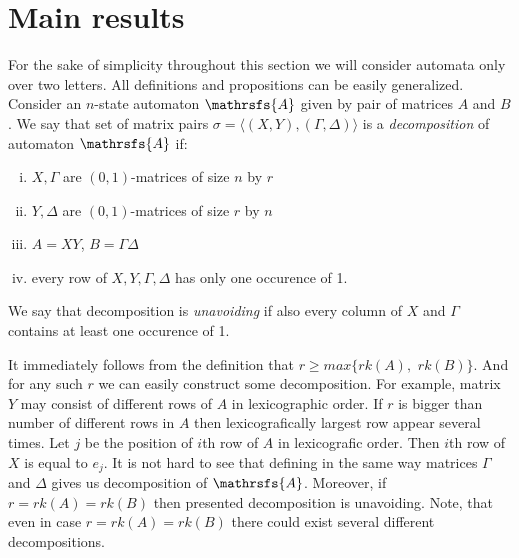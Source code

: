 \documentclass[11pt]{llncs}
\newcommand{\A}{\mathrsfs{A}}
\newcommand{\G}{\Gamma}
\newcommand{\D}{\Delta}
\newcommand{\rk}{rk}
\begin{document}
\section{Main results}
For the sake of simplicity throughout this section we will consider automata only
over two letters. All definitions and propositions can be easily generalized.
Consider an $n$-state automaton $\A$ given by pair of matrices $A$ and $B$.
We say that set of matrix pairs $\sigma = \langle(X,Y), (\G,\D)\rangle$ is
a \emph{decomposition} of automaton $\A$ if:
\begin{enumerate}[(i)]
\item $X, \G$ are $(0,1)$-matrices of size $n$ by $r$
\item $Y, \D$ are $(0,1)$-matrices of size $r$ by $n$
\item $A = XY$, $B = \G\D$
\item every row of $X,Y,\G,\D$ has only one occurence of 1.
\end{enumerate}
We say that decomposition is \emph{unavoiding} if also every column of $X$ and 
$\G$ contains at least one occurence of 1.

It immediately follows from the definition that $r \geq max\{\rk(A),$ $\rk(B)\}$.
And for any such $r$ we can easily construct some decomposition. 
For example, matrix $Y$ may consist of different rows of $A$ in lexicographic order.
If $r$ is bigger than number of different rows in $A$ then lexicografically largest row 
appear several times. Let $j$ be the position of $i$th row of $A$ in lexicografic order.
Then $i$th row of $X$ is equal to $e_j$. It is not hard to see that defining in the 
same way matrices $\G$ and $\D$ gives us decomposition of $\A$. Moreover,
if $r = \rk(A) = \rk(B)$ then presented decomposition is unavoiding. Note, that even in case
$r = \rk(A) = \rk(B)$ there could exist several different decompositions.
\end{document}
